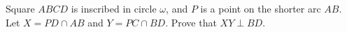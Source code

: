 Square $ABCD$ is inscribed in circle $\omega$, and $P$ is a point on the shorter arc $AB$. Let $X=PD\cap AB$ and $Y=PC\cap BD$. Prove that $XY\perp BD$.
